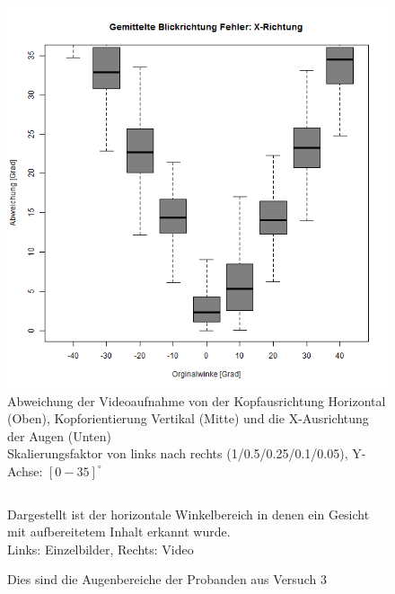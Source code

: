 \begin{landscape}
\begin{figure}
		\includegraphics[width=0.192\linewidth]{OpenFace_Img/EyeAVG_x_Err_S005}
		\caption{Abweichung der Videoaufnahme von der Kopfausrichtung Horizontal (Oben), Kopforientierung Vertikal (Mitte) und die X-Ausrichtung der Augen (Unten)\\Skalierungsfaktor von links nach rechts (1/0.5/0.25/0.1/0.05), Y-Achse: $[0-35]^\circ$}
		\label{graph_VideoSkalierung_Err}
	\end{figure}
\begin{figure}
	\centering
	\begin{tabular}{ll}
		
		
	\end{tabular}
	\caption{Dargestellt ist der horizontale Winkelbereich in denen ein Gesicht mit aufbereitetem Inhalt erkannt wurde.\\
		Links: Einzelbilder, Rechts: Video}
	\label{graph_Test_1_Resize}
\end{figure}
\begin{figure}
	\centering
	
	\caption{Dies sind die Augenbereiche der Probanden aus Versuch 3}
	\label{Augenbereich_Versuch3}
\end{figure}
\end{landscape}
